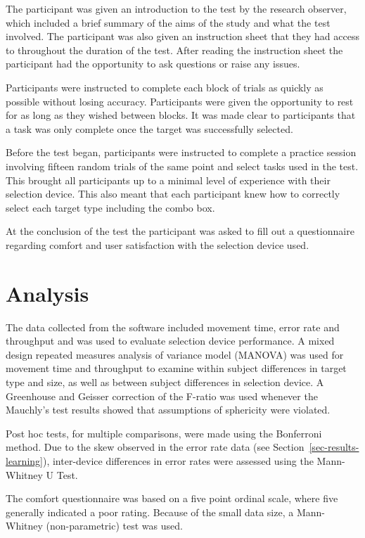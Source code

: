 \documentclass[reviewcopy]{elsart}
\begin{document}
The participant was given an introduction to the test by the research
observer, which included a brief summary of the aims of the study and
what the test involved. The participant was also given an instruction
sheet that they had access to throughout the duration of the test. After
reading the instruction sheet the participant had the opportunity to ask
questions or raise any issues.

Participants were instructed to complete each block of trials as quickly
as possible without losing accuracy. Participants were given the
opportunity to rest for as long as they wished between blocks. It was
made clear to participants that a task was only complete once the target
was successfully selected.

Before the test began, participants were instructed to complete a
practice session involving fifteen random trials of the same point and
select tasks used in the test. This brought all participants up to a
minimal level of experience with their selection device. This also meant
that each participant knew how to correctly select each target type
including the combo box.

At the conclusion of the test the participant was asked to fill out a
questionnaire regarding comfort and user satisfaction with the selection
device used.


\section{Analysis}
\label{sec-analysis}

The data collected from the software included movement time, error rate
and throughput and was used to evaluate selection device performance. A
mixed design repeated measures analysis of variance model (MANOVA) was
used for movement time and throughput to examine within subject
differences in target type and size, as well as between subject
differences in selection device. A Greenhouse and Geisser correction of
the F-ratio was used whenever the Mauchly's test results showed that
assumptions of sphericity were violated.

Post hoc tests, for multiple comparisons, were made using the Bonferroni
method. Due to the skew observed in the error rate data (see
Section~\ref{sec-results-learning}), inter-device differences in error
rates were assessed using the Mann-Whitney U Test.

The comfort questionnaire was based on a five point ordinal scale, where
five generally indicated a poor rating. Because of the small data size, a
Mann-Whitney (non-parametric) test was used.
\end{document}
